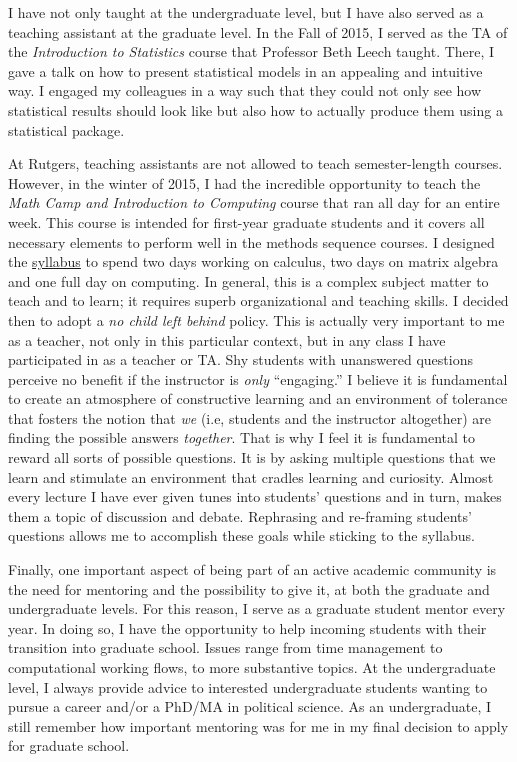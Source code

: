 \documentclass[11pt]{letter} %
\begin{document}
\begin{letter}{}
I have not only taught at the undergraduate level, but I have also served as a teaching assistant at the graduate level. In the Fall of 2015, I served as the TA of the \emph{Introduction to Statistics} course that Professor Beth Leech taught. There, I gave a talk on how to present statistical models in an appealing and intuitive way. I engaged my colleagues in a way such that they could not only see how statistical results should look like but also how to actually produce them using a statistical package. 

At Rutgers, teaching assistants are not allowed to teach semester-length courses. However, in the winter of 2015, I had the incredible opportunity to teach the \emph{Math Camp and Introduction to Computing} course that ran all day for an entire week. This course is intended for first-year graduate students and it covers all necessary elements to perform well in the methods sequence courses. I designed the \href{https://github.com/hbahamonde/Math-Camp/raw/master/Syllabus/Math_Camp_Syllabus.pdf}{syllabus} to spend two days working on calculus, two days on matrix algebra and one full day on computing. In general, this is a complex subject matter to teach and to learn; it requires superb organizational and teaching skills. I decided then to adopt a \emph{no child left behind} policy. This is actually very important to me as a teacher, not only in this particular context, but in any class I have participated in as a teacher or TA. Shy students with unanswered questions perceive no benefit if the instructor is \emph{only} ``engaging.'' I believe it is fundamental to create an atmosphere of constructive learning and an environment of tolerance that fosters the notion that \emph{we} (i.e, students and the instructor altogether) are finding the possible answers \emph{together}. That is why I feel it is fundamental to reward all sorts of possible questions. It is by asking multiple questions that we learn and stimulate an environment that cradles learning and curiosity. Almost every lecture I have ever given tunes into students' questions and in turn, makes them a topic of discussion and debate. Rephrasing and re-framing students' questions allows me to accomplish these goals while sticking to the syllabus. 

Finally, one important aspect of being part of an active academic community is the need for mentoring and the possibility to give it, at both the graduate and undergraduate levels. For this reason, I serve as a graduate student mentor every year. In doing so, I have the opportunity to help incoming students with their transition into graduate school. Issues range from time management to computational working flows, to more substantive topics. At the undergraduate level, I always provide advice to interested undergraduate students wanting to pursue a career and/or a PhD/MA in political science. As an undergraduate, I still remember how important mentoring was for me in my final decision to apply for graduate school.


\end{letter}
\end{document}
